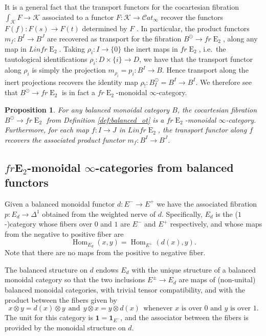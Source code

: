 \documentclass[reqno]{amsart}
\newtheorem{proposition}[lemma]{Proposition}
\theoremstyle{definition}
\newcommand{\msc}[1]{\mathscr{#1}}
\newcommand{\opn}[1]{\operatorname{#1}}
\newcommand{\ot}{\otimes}
\newcommand{\sCat}{\msc{C}\!at}
\newcommand{\E}{\mathbf{E}}
\DeclareMathOperator{\Hom}{Hom}
\renewcommand{\1}{\mathbf{1}}
\begin{document}
It is a general fact that the transport functors for the cocartesian fibration $\int_{\msc{K}}F\to \msc{K}$ associated to a functor $F:\msc{K}\to \sCat_{\infty}$ recover the functors $F(f):F(s)\to F(t)$ determined by $F$ \cite[\href{https://kerodon.net/tag/027K}{027}]{kerodon}. In particular, the product functors $m_f:B^I\to B^J$ are recovered as transport for the fibration $B^{\odot}\to fr\opn{E}_2$, along any map in $Linfr\opn{E}_2$.  Taking $\rho_i:I\to \{0\}$ the inert maps in $fr\opn{E}_2$, i.e.\ the tautological identifications $\rho_i:D\times\{i\}\to D$, we have that the transport functor along $\rho_i$ is simply the projection $m_{\rho_i}=p_i:B^I\to B$. Hence transport along the inert projections recovers the identity map $\rho_!:B^{\odot}_I=B^I\to B^I$. We therefore see that $B^{\odot}\to fr\opn{E}_2$ is in fact a $fr\opn{E}_2$-monoidal $\infty$-category.

\begin{proposition}\label{prop:bal_fre2_monidal}
For any balanced monoidal category $B$, the cocartesian fibration $B^{\odot}\to fr\opn{E}_2$ from Definition \ref{def:balanced_ot} is a $fr\opn{E}_2$-monoidal $\infty$-category. Furthermore, for each map $f:I\to J$ in $Linfr\opn{E}_2$, the transport functor along $f$ recovers the associated product functor $m_f:B^I\to B^J$.
\end{proposition}

\subsection{$fr\E_2$-monoidal $\infty$-categories from balanced functors}
\label{sect:e_ot_const}

Given a balanced monoidal functor $d:E^-\to E^+$ we have the associated fibration $p:E_d\to \Delta^1$ obtained from the weighted nerve of $d$.  Specifically, $E_d$ is the ($1$-)category whose fibers over $0$ and $1$ are $E^-$ and $E^+$ respectively, and whose maps from the negative to positive fiber are
\[
\Hom_{E_d}(x,y)=\Hom_{E^+}(d(x),y).
\]
Note that there are no maps from the positive to negative fiber.
\par

The balanced structure on $d$ endows $E_d$ with the unique structure of a balanced monoidal category so that the two inclusions $E^{\pm}\to E_d$ are maps of (non-unital) balanced monoidal categories, with trivial tensor compatibility, and with the product between the fibers given by
\[
x\ot y=d(x)\ot y\ \ \text{and}\ \ y\ot x=y\ot d(x)\ \ \text{whenever $x$ is over $0$ and $y$ is over }1.
\]
The unit for this category is $\1= \1_{E^-}$, and the associator between the fibers is provided by the monoidal structure on $d$.
\end{document}
